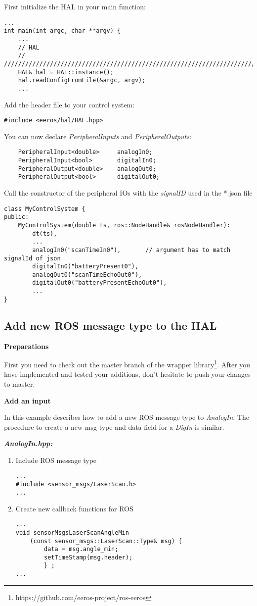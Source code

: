 First initialize the HAL in your main function:
\lstset{language=c}
\begin{lstlisting}
...
int main(int argc, char **argv) {
	...
	// HAL
	// ////////////////////////////////////////////////////////////////////////
	HAL& hal = HAL::instance();
	hal.readConfigFromFile(&argc, argv);
	...
\end{lstlisting}

Add the header file to your control system:
\lstset{language=c}
\begin{lstlisting}
#include <eeros/hal/HAL.hpp>
\end{lstlisting}

You can now declare \textit{PeripheralInputs} and \textit{PeripheralOutputs}:
\lstset{language=c}
\begin{lstlisting}
	PeripheralInput<double>		analogIn0;
	PeripheralInput<bool>		digitalIn0;
	PeripheralOutput<double>	analogOut0;
	PeripheralOutput<bool>		digitalOut0;
\end{lstlisting}

Call the constructor of the peripheral IOs with the \textit{signalID} used in the *.json file
\begin{lstlisting}
class MyControlSystem {
public:
	MyControlSystem(double ts, ros::NodeHandle& rosNodeHandler):
		dt(ts),
		...
		analogIn0("scanTimeIn0"),		// argument has to match signalId of json
		digitalIn0("batteryPresent0"),
		analogOut0("scanTimeEchoOut0"),
		digitalOut0("batteryPresentEchoOut0"),
		...
}
\end{lstlisting}


\subsection{Add new ROS message type to the HAL}
\label{sectionImplementMsgType}
\textbf{Preparations}

First you need to check out the master branch of the wrapper library\footnote{https://github.com/eeros-project/ros-eeros}.
After you have implemented and tested your additions, don't hesitate to push your changes to master.


\textbf{Add an input}

In this example describes how to add a new ROS message type to \textit{AnalogIn}.
The procedure to create a new msg type and data field for a \textit{DigIn} is similar.

\textbf{\textit{AnalogIn.hpp:}}
\begin{enumerate}[\hspace{0.5cm}1{.)}]
	\item Include ROS message type
	\lstset{language=c}
	\begin{lstlisting}
...
#include <sensor_msgs/LaserScan.h>
...
	\end{lstlisting}
	
	\item Create new callback functions for ROS
	\lstset{language=c}
	\begin{lstlisting}
...
void sensorMsgsLaserScanAngleMin
	(const sensor_msgs::LaserScan::Type& msg) {
		data = msg.angle_min;
		setTimeStamp(msg.header);
		} ;
...
\end{lstlisting}
\end{enumerate}

